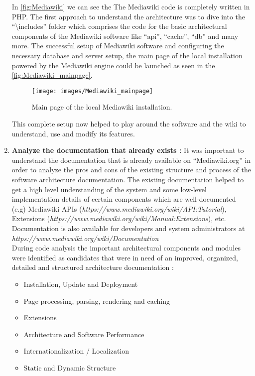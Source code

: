 \begin{enumerate}
In \autoref{fig:Mediawiki}  we can see the The Mediawiki code is completely written in PHP. The first approach to understand the architecture was to dive into the \enquote{\textbackslash{includes}} folder which comprises the code for the basic architectural components of the Mediawiki software like \enquote{api}, \enquote{cache}, \enquote{db} and many more. 
\indent 
\indent The successful setup of Mediawiki software and configuring the necessary database and server setup, the main page of the local installation powered by the Mediawiki engine could be launched as seen in the \autoref{fig:Mediawiki_mainpage}.
\begin{figure}[H]
  \centering
  \texttt{[image: images/Mediawiki\_mainpage]}
  \caption[Main page of the local Mediawiki installation]{Main page of the local Mediawiki installation.}\label{fig:Mediawiki_mainpage}
\end{figure}
This complete setup now helped to play around the software and the wiki to understand, use and modify its features.
\item \textbf{Analyze the documentation that already exists : } It was important to understand the documentation that is already available on \enquote{Mediawiki.org} in order to analyze the pros and cons of the existing structure and process of the software architecture documentation. The existing documentation helped to get a high level understanding of the system and some low-level implementation details of certain components which are well-documented (e.g) Mediawiki APIs (\emph{https://www.mediawiki.org/wiki/API:Tutorial}), Extensions (\emph{https://www.mediawiki.org/wiki/Manual:Extensions}), etc. Documentation is also available for developers and system administrators at
\emph{https://www.mediawiki.org/wiki/Documentation}
\\\indent  During code analysis the important architectural components and modules were identified as candidates that were in need of an improved, organized, detailed and structured architecture documentation :
\begin{itemize}
\item Installation, Update and Deployment
\item Page processing, parsing, rendering and caching
\item Extensions
\item Architecture and Software Performance
\item Internationalization / Localization
\item Static and Dynamic Structure

\end{itemize}
\end{enumerate}
